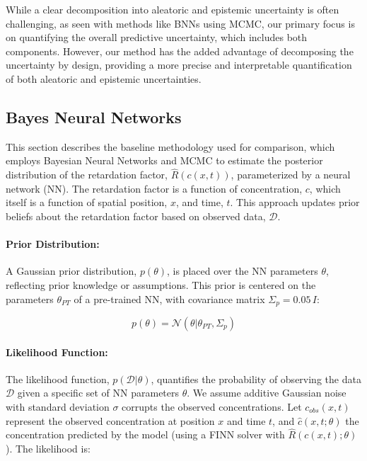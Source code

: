 While a clear decomposition into aleatoric and epistemic uncertainty is often challenging, as seen with methods like BNNs using MCMC, our primary focus is on quantifying the overall predictive uncertainty, which includes both components. However, our method has the added advantage of decomposing the uncertainty by design, providing a more precise and interpretable quantification of both aleatoric and epistemic uncertainties.





\subsection{Bayes Neural Networks}
\label{sec:bayes_nn}
This section describes the baseline methodology used for comparison, which employs Bayesian Neural Networks and MCMC to estimate the posterior distribution of the retardation factor, $\hat{R}(c(x,t))$, parameterized by a neural network (NN). The retardation factor is a function of concentration, $c$, which itself is a function of spatial position, $x$, and time, $t$. This approach updates prior beliefs about the retardation factor based on observed data, $\mathcal{D}$.

\paragraph{Prior Distribution:}

A Gaussian prior distribution, $p(\theta)$, is placed over the NN parameters $\theta$, reflecting prior knowledge or assumptions. This prior is centered on the parameters $\theta_{PT}$ of a pre-trained NN, with covariance matrix $\Sigma_p = 0.05 \, I$:


\begin{equation*}
p(\theta) = \mathcal{N}(\theta | \theta_{PT}, \Sigma_p)
\end{equation*}

\paragraph{Likelihood Function:}

The likelihood function, $p(\mathcal{D} | \theta)$, quantifies the probability of observing the data $\mathcal{D}$ given a specific set of NN parameters $\theta$. We assume additive Gaussian noise with standard deviation $\sigma$ corrupts the observed concentrations. Let $c_{obs}(x,t)$ represent the observed concentration at position $x$ and time $t$, and $\hat{c}(x,t; \theta)$ the concentration predicted by the model (using a FINN solver with $\hat{R}(c(x,t);\theta)$). The likelihood is:

